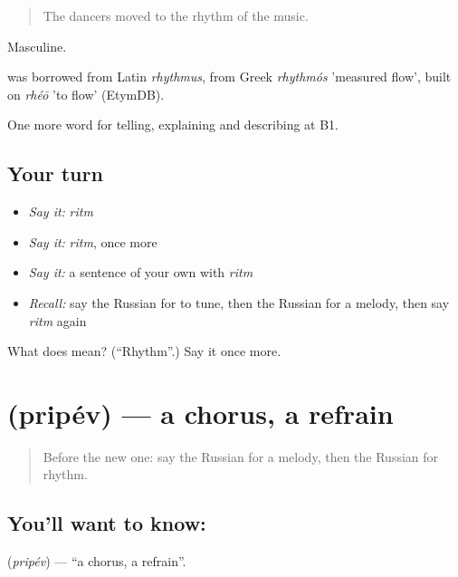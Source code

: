 \begin{quote}
The dancers moved to the rhythm of the music.
\end{quote}

Masculine.

\begin{cousinweb}
\emph{} was borrowed from Latin \emph{rhythmus}, from Greek \emph{rhythmós} 'measured flow', built on \emph{rhéō} 'to flow' (EtymDB).
\end{cousinweb}

\begin{grammarlens}[title={What you've built}]
One more word for telling, explaining and describing at B1.
\end{grammarlens}

\subsection*{Your turn}
\begin{itemize}
\raggedright
  \item \emph{Say it:} \emph{ritm}
  \item \emph{Say it:} \emph{ritm}, once more
  \item \emph{Say it:} a sentence of your own with \emph{ritm}
  \item \emph{Recall:} say the Russian for to tune, then the Russian for a melody, then say \emph{ritm} again
\end{itemize}

\begin{tcolorbox}[breakable,colback=teal!4,colframe=teal!35!black,title={Before you move on}]
What does  mean? (\textquotedblleft{}Rhythm\textquotedblright{}.) Say it once more.
\end{tcolorbox}
\section[\texorpdfstring{\ru{припев} (pripév)}{припев (pripév)}]{ (pripév) — a chorus, a refrain}

\label{lesson:RU-C516-pripev}



\begin{quote}
Before the new one: say the Russian for a melody, then the Russian for rhythm.
\end{quote}

\subsection*{You'll want to know: }
\textbf{} (\emph{pripév}) — \textquotedblleft{}a chorus, a refrain\textquotedblright{}.

